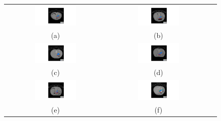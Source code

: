 \begin{figure}[h!]
	\begin{center}
		\vspace{0.4cm}
		{
			\begin{tabular}{ccc}
				\includegraphics[width=0.425\textwidth]{Bulgular-Irdeleme/Figures/p65_slice94.pdf} & \includegraphics[width=0.425\textwidth]{Bulgular-Irdeleme/Figures/p68_slice88.pdf} \\
				(a) & (b) \\
				\includegraphics[width=0.425\textwidth]{Bulgular-Irdeleme/Figures/p70_slice100.pdf} & \includegraphics[width=0.425\textwidth]{Bulgular-Irdeleme/Figures/p74_slice100.pdf} \\
				(c) & (d) \\
				\includegraphics[width=0.425\textwidth]{Bulgular-Irdeleme/Figures/p76_slice92.pdf} & \includegraphics[width=0.425\textwidth]{Bulgular-Irdeleme/Figures/p78_slice134.pdf} \\
				(e) & (f) 
			\end{tabular}
		}
	\end{center}
\end{figure}

